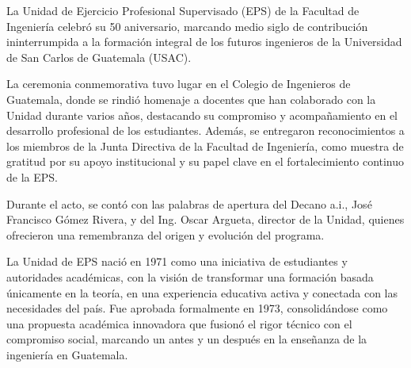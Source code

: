 \documentclass[12pt,spanish,Letterpaper,openany]{book}
\begin{document}
La Unidad de Ejercicio Profesional Supervisado (EPS) de la Facultad de Ingeniería celebró su 50 aniversario, marcando medio siglo de contribución ininterrumpida a la formación integral de los futuros ingenieros de la Universidad de San Carlos de Guatemala (USAC).

La ceremonia conmemorativa tuvo lugar en el Colegio de Ingenieros de Guatemala, donde se rindió homenaje a docentes que han colaborado con la Unidad durante varios años, destacando su compromiso y acompañamiento en el desarrollo profesional de los estudiantes. Además, se entregaron reconocimientos a los miembros de la Junta Directiva de la Facultad de Ingeniería, como muestra de gratitud por su apoyo institucional y su papel clave en el fortalecimiento continuo de la EPS.

Durante el acto, se contó con las palabras de apertura del Decano a.i., José Francisco Gómez Rivera, y del Ing. Oscar Argueta, director de la Unidad, quienes ofrecieron una remembranza del origen y evolución del programa.

La Unidad de EPS nació en 1971 como una iniciativa de estudiantes y autoridades académicas, con la visión de transformar una formación basada únicamente en la teoría, en una experiencia educativa activa y conectada con las necesidades del país. Fue aprobada formalmente en 1973, consolidándose como una propuesta académica innovadora que fusionó el rigor técnico con el compromiso social, marcando un antes y un después en la enseñanza de la ingeniería en Guatemala.
\end{document}
